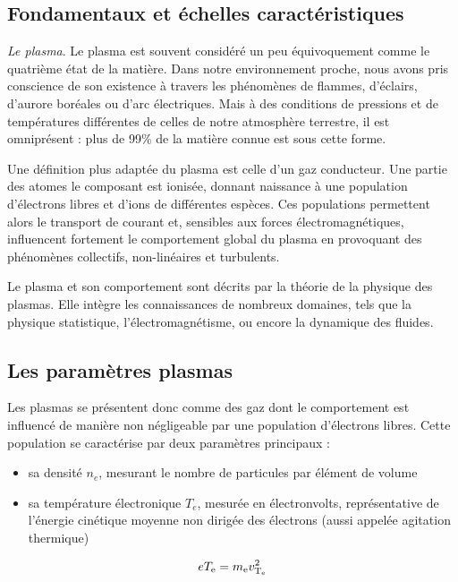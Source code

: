 \label{Introduction}
\begin{refsection}

\section{Fondamentaux et échelles caractéristiques}
\emph{Le plasma}. Le plasma est souvent considéré un peu équivoquement comme le
quatrième état de la matière. Dans notre environnement proche, nous avons pris
conscience de son existence à travers les phénomènes de flammes, d'éclairs,
d'aurore boréales ou d'arc électriques. Mais à des conditions de pressions et de
températures différentes de celles de notre atmosphère terrestre, il est
omniprésent : plus de 99\% de la matière connue est sous cette forme.

Une définition plus adaptée du plasma est celle d'un gaz conducteur. Une partie
des atomes le composant est ionisée, donnant naissance à une population
d'électrons libres et d'ions de différentes espèces. Ces populations permettent
alors le transport de courant et, sensibles aux forces électromagnétiques,
influencent fortement le comportement global du plasma en provoquant des
phénomènes collectifs, non-linéaires et turbulents.

Le plasma et son comportement sont décrits par la théorie de la physique des
plasmas. Elle intègre les connaissances de nombreux domaines, tels que la
physique statistique, l'électromagnétisme, ou encore la dynamique des fluides.

\subsection{Les paramètres plasmas}
Les plasmas se présentent donc comme des gaz dont le comportement est influencé
de manière non négligeable par une population d'électrons libres. Cette population
se caractérise par deux paramètres principaux :

\begin{itemize}
  \item sa densité $n_e$, mesurant le nombre
  de particules par élément de volume
  \item sa température électronique $T_e$, mesurée en électronvolts, représentative
   de l'énergie cinétique moyenne non dirigée des électrons (aussi appelée
   agitation thermique)
\end{itemize}

\begin{equation}
	eT_\text{e}=m_\text{e} v_{\text{T}_\text{e}}^{{2}}
\end{equation}


\end{refsection}
